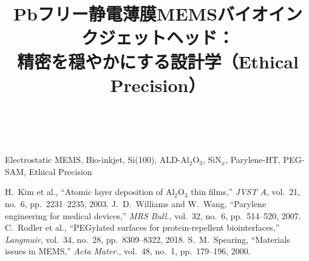 \documentclass[conference]{IEEEtran}
\title{Pbフリー静電薄膜MEMSバイオインクジェットヘッド：\\
\large 精密を穏やかにする設計学（Ethical Precision）}
\author{\IEEEauthorblockN{三溝 真一（Shinichi Samizo)}\\
\IEEEauthorblockA{独立系半導体研究者\\
Email: \href{mailto:shin3t72@gmail.com}{shin3t72@gmail.com}\quad
GitHub: \url{https://github.com/Samizo-AITL}}}
\begin{document}
\maketitle



\begin{IEEEkeywords}
Electrostatic MEMS, Bio-inkjet, Si(100), ALD-Al$_2$O$_3$, SiN$_x$, Parylene-HT, PEG-SAM, Ethical Precision
\end{IEEEkeywords}












\begin{thebibliography}{9}
 H.~Kim et al., ``Atomic layer deposition of Al$_2$O$_3$ thin films,'' \emph{JVST A}, vol.~21, no.~6, pp.~2231--2235, 2003.
 J.~D.~Williams and W.~Wang, ``Parylene engineering for medical devices,'' \emph{MRS Bull.}, vol.~32, no.~6, pp.~514--520, 2007.
 C.~Rodler et al., ``PEGylated surfaces for protein-repellent biointerfaces,'' \emph{Langmuir}, vol.~34, no.~28, pp.~8309--8322, 2018.
 S.~M.~Spearing, ``Materials issues in MEMS,'' \emph{Acta Mater.}, vol.~48, no.~1, pp.~179--196, 2000.
\end{thebibliography}

\balance
\end{document}
